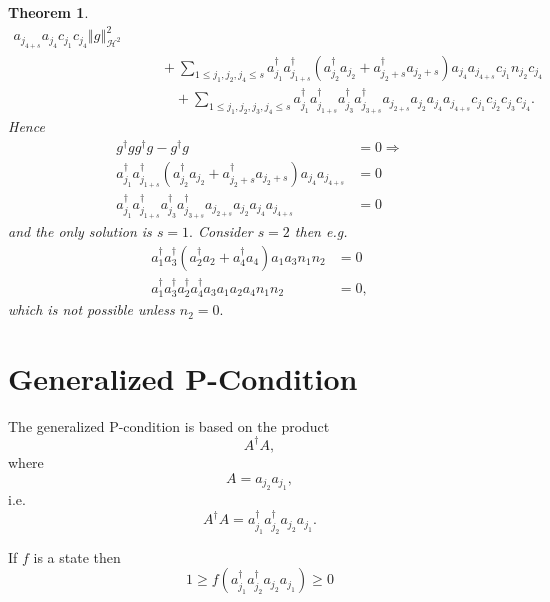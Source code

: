 \documentclass[aps,preprint]{revtex4}%
\newtheorem{theorem}{Theorem}
\begin{document}
\begin{theorem}
\begin{align}
{}a_{j_{4+s}}a_{j_{4}}c_{j_{1}}c_{j_{4}}\left\Vert g\right\Vert _{\mathcal{H}%
^{2}}^{2}\\
&  \qquad+\sum_{1\leq j_{1},j_{2},j_{4}\leq s}a_{j_{1}}^{\dagger}a_{j_{1+s}%
}^{\dagger}\left(  a_{j_{2}}^{\dagger}a_{j_{2}}+a_{j_{2}+s}^{\dagger}%
a_{j_{2}+s}\right)  a_{j_{4}}a_{j_{4+s}}c_{j_{1}}n_{j_{2}}c_{j_{4}}\\
&  \quad\qquad+\sum_{1\leq j_{1},j_{2},j_{3},j_{4}\leq s}a_{j_{1}}^{\dagger
}a_{j_{1+s}}^{\dagger}a_{j_{3}}^{\dagger}a_{j_{3+s}}^{\dagger}a_{j_{2+s}%
}a_{j_{2}}a_{j_{4}}a_{j_{4+s}}c_{j_{1}}c_{j_{2}}c_{j_{3}}c_{j_{4}}.
\end{align}
Hence
\begin{align}
g^{\dagger}gg^{\dagger}g-g^{\dagger}g  &  =0\Rightarrow\\
a_{j_{1}}^{\dagger}a_{j_{1+s}}^{\dagger}\left(  a_{j_{2}}^{\dagger}a_{j_{2}%
}+a_{j_{2}+s}^{\dagger}a_{j_{2}+s}\right)  a_{j_{4}}a_{j_{4+s}}  &  =0\\
a_{j_{1}}^{\dagger}a_{j_{1+s}}^{\dagger}a_{j_{3}}^{\dagger}a_{j_{3+s}%
}^{\dagger}a_{j_{2+s}}a_{j_{2}}a_{j_{4}}a_{j_{4+s}}  &  =0
\end{align}
and the only solution is $s=1.$ Consider $s=2$ then e.g.%
\begin{align}
a_{1}^{\dagger}a_{3}^{\dagger}\left(  a_{2}^{\dagger}a_{2}+a_{4}^{\dagger
}a_{4}\right)  a_{1}a_{3}n_{1}n_{2}  &  =0\\
a_{1}^{\dagger}a_{3}^{\dagger}a_{2}^{\dagger}a_{4}^{\dagger}a_{3}a_{1}%
a_{2}a_{4}n_{1}n_{2}  &  =0,
\end{align}
which is not possible unless $n_{2}=0.$
\end{theorem}

\section{Generalized P-Condition}

The generalized P-condition is based on the product
\begin{equation}
A^{\dagger}A,
\end{equation}
where
\begin{equation}
A=a_{j_{2}}a_{j_{1}},
\end{equation}
i.e.%
\begin{equation}
A^{\dagger}A=a_{j_{1}}^{\dagger}a_{j_{2}}^{\dagger}a_{j_{2}}a_{j_{1}}.
\end{equation}


If $f$ is a state then%
\begin{equation}
1\geq f\left(  a_{j_{1}}^{\dagger}a_{j_{2}}^{\dagger}a_{j_{2}}a_{j_{1}%
}\right)  \geq0
\end{equation}
\end{document}
